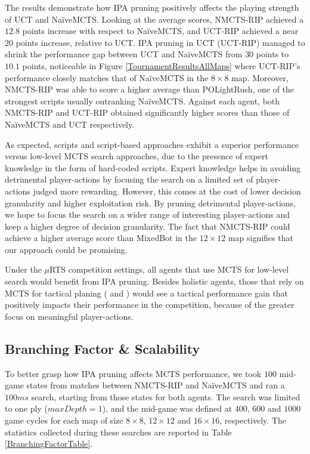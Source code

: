 \documentclass[conference]{IEEEtran}
\newcommand{\mRTS}{$\mu$RTS}
\begin{document}
The results demonstrate how IPA pruning positively affects the playing strength of UCT and NaïveMCTS. Looking at the average scores, NMCTS-RIP achieved a $12.8$ points increase with respect to NaïveMCTS, and UCT-RIP achieved a near $20$ points increase, relative to UCT. IPA pruning in UCT (UCT-RIP) managed to shrink the performance gap between UCT and NaïveMCTS from $30$ points to $10.1$ points, noticeable in Figure \ref{TournamentResultsAllMaps} where UCT-RIP's performance closely matches that of NaïveMCTS in the $8\times8$ map. Moreover, NMCTS-RIP was able to score a higher average than POLightRush, one of the strongest scripts usually outranking NaïveMCTS. Against each agent, both NMCTS-RIP and UCT-RIP obtained significantly higher scores than those of NaïveMCTS and UCT respectively.

As expected, scripts and script-based approaches exhibit a superior performance versus low-level MCTS search approaches, due to the presence of expert knowledge in the form of hard-coded scripts. Expert knowledge helps in avoiding detrimental player-actions by focusing the search on a limited set of player-actions judged more rewarding. However, this comes at the cost of lower decision granularity and higher exploitation risk. By pruning detrimental player-actions, we hope to focus the search on a wider range of interesting player-actions and keep a higher degree of decision granularity. The fact that NMCTS-RIP could achieve a higher average score than MixedBot in the $12\times12$ map signifies that our approach could be promising.

Under the \mRTS{} competition settings, all agents that use MCTS for low-level search would benefit from IPA pruning. Besides holistic agents, those that rely on MCTS for tactical planing (\cite{barriga_combining_2017} and \cite{moraes_action_2018}) would see a tactical performance gain that positively impacts their performance in the competition, because of the greater focus on meaningful player-actions. 


\subsection{Branching Factor \& Scalability}

To better grasp how IPA pruning affects MCTS performance, we took $100$ mid-game states from matches between NMCTS-RIP and NaïveMCTS and ran a $100ms$ search, starting from those states for both agents. The search was limited to one ply ($maxDepth=1$), and the mid-game was defined at $400$, $600$ and $1000$ game cycles for each map of size $8\times8$, $12\times12$ and $16\times16$, respectively. The statistics collected during these searches are reported in Table \ref{BranchingFactorTable}.
\end{document}
